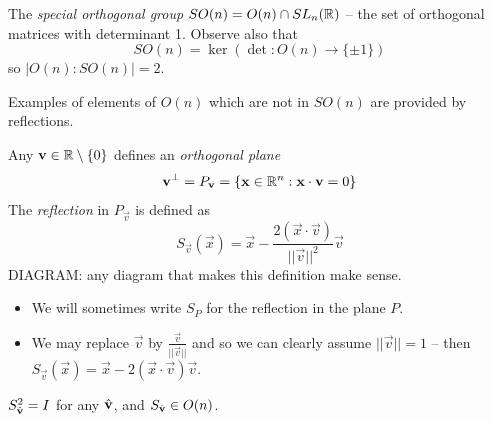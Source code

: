 \documentclass{../../template/note}
\begin{document}

    \begin{definition}
        The \emph{special orthogonal group} \(SO(n) = O(n) \cap SL_n(\mathbb R)\) -- the set of orthogonal matrices with determinant 1. Observe also that
        \[
            SO(n) = \ker(\det: O(n) \to \{\pm 1\})
        \]
        so \(|O(n):SO(n)| = 2\).
    \end{definition}
    Examples of elements of \(O(n)\) which are not in \(SO(n)\) are provided by reflections.

    \begin{definition}[Reflections]
        Any \(\vec v \in \RR \setminus \{0\}\) defines an \emph{orthogonal plane}
        \[
            \vec v^\perp = P_{\vec v} = \{\vec x \in \RR^n: \vec x \cdot \vec v = 0\}
        \]
        The \emph{reflection} in \(P_{\vec v}\) is defined as
        \[
            S_{\vec v}(\vec x) = \vec x - \frac{2(\vec x \cdot \vec v)}{||\vec v||^2}\vec v
        \]
        DIAGRAM: any diagram that makes this definition make sense.
    \end{definition}
    
    \begin{remark}
        \begin{itemize}
            \item We will sometimes write \(S_P\) for the reflection in the plane \(P\).
            \item We may replace \(\vec v\) by \(\frac{\vec v}{||\vec v||}\) and so we can clearly assume \(||\vec v|| = 1\) -- then \(S_{\vec v}(\vec x) = \vec x - 2(\vec x \cdot \vec v)\vec v\).
        \end{itemize}
    \end{remark}
    
    \begin{lemma}
        \(S_{\hvec v}^2 = I\) for any \(\hvec v\), and \(S_{\hvec v} \in O(n)\).
    \end{lemma}
    
\end{document}
